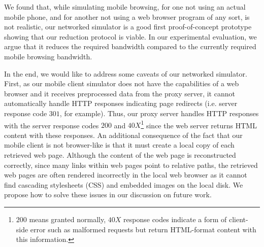 We found that, while simulating mobile browsing, for one not using an actual mobile phone, and for another not using a web browser program of any sort, is not realistic, our networked simulator is a good first proof-of-concept prototype showing that our reduction protocol is viable. In our experimental evaluation, we argue that it reduces the required bandwidth compared to the currently required mobile browsing bandwidth.

In the end, we would like to address some caveats of our networked simulator. First, as our mobile client simulator does not have the capabilities of a web browser and it receives preprocessed data from the proxy server, it cannot automatically handle HTTP responses indicating page redirects (i.e. server response code $301$, for example). Thus, our proxy server handles HTTP responses with the server response codes $200$ and $40X$\footnote{$200$ means granted normally, $40X$ response codes indicate a form of client-side error such as malformed requests but return HTML-format content with this information.} since the web server returns HTML content with these responses. An additional consequence of the fact that our mobile client is not browser-like is that it must create a local copy of each retrieved web page. Although the content of the web page is reconstructed correctly, since many links within web pages point to relative paths, the retrieved web pages are often rendered incorrectly in the local web browser as it cannot find cascading stylesheets (CSS) and embedded images on the local disk. We propose how to solve these issues in our discussion on future work.
